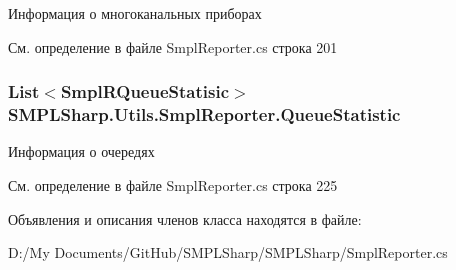 Информация о многоканальных приборах 



См. определение в файле Smpl\-Reporter.\-cs строка 201

\hypertarget{class_s_m_p_l_sharp_1_1_utils_1_1_smpl_reporter_a242251fbbe1facd190ed723f52285bfb}{
\subsubsection[{Queue\-Statistic}]{\setlength{\rightskip}{0pt plus 5cm}List$<${\bf Smpl\-R\-Queue\-Statisic}$>$ S\-M\-P\-L\-Sharp.\-Utils.\-Smpl\-Reporter.\-Queue\-Statistic\hspace{0.3cm}{\ttfamily [get]}}}\label{d2/d18/class_s_m_p_l_sharp_1_1_utils_1_1_smpl_reporter_a242251fbbe1facd190ed723f52285bfb}


Информация о очередях 



См. определение в файле Smpl\-Reporter.\-cs строка 225



Объявления и описания членов класса находятся в файле\-:\begin{DoxyCompactItemize}
\item 
D\-:/\-My Documents/\-Git\-Hub/\-S\-M\-P\-L\-Sharp/\-S\-M\-P\-L\-Sharp/Smpl\-Reporter.\-cs\end{DoxyCompactItemize}
